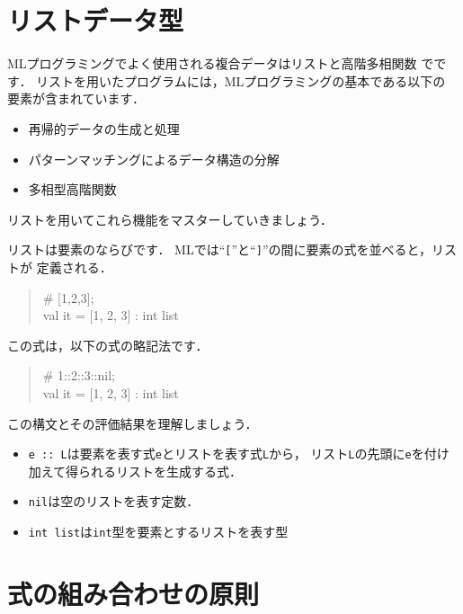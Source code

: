 \documentclass{jbook}
\begin{document}
\section{リストデータ型}
\label{sec:tutorialList}

	MLプログラミングでよく使用される複合データはリストと高階多相関数
でです．
	リストを用いたプログラムには，MLプログラミングの基本である以下の
要素が含まれています．
\begin{itemize}
\item 
再帰的データの生成と処理
\item 
パターンマッチングによるデータ構造の分解
\item 
多相型高階関数
\end{itemize}
	リストを用いてこれら機能をマスターしていきましょう．

リストは要素のならびです．
	MLでは``{\tt [}''と``{\tt ]}''の間に要素の式を並べると，リストが
定義される．
\begin{tt}
\begin{quote}
\# [1,2,3];\\
val it = [1, 2, 3] : int list
\end{quote}
\end{tt}
	この式は，以下の式の略記法です．
\begin{tt}
\begin{quote}
\# 1::2::3::nil;\\
val it = [1, 2, 3] : int list
\end{quote}
\end{tt}
	この構文とその評価結果を理解しましょう．
\begin{itemize}
\item 
 {\tt e :: L}は要素を表す式{\tt e}とリストを表す式{\tt L}から，
リスト{\tt L}の先頭に{\tt e}を付け加えて得られるリストを生成する式．
\item 
{\tt nil}は空のリストを表す定数．
\item 
{\tt int list}は{\tt int}型を要素とするリストを表す型
\end{itemize}

\section{式の組み合わせの原則}
\label{sec:tutorialTypingprinciple}
\end{document}
